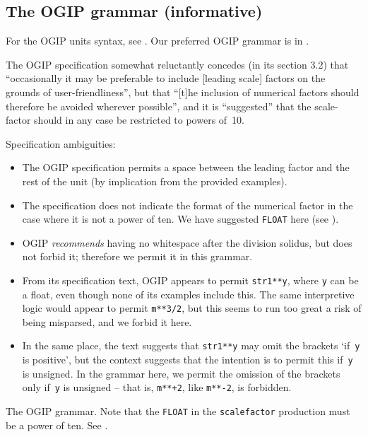 \documentclass[11pt,a4paper]{ivoa}
\begin{document}
\subsection{The OGIP grammar (informative)}
\label{appx:ogipgrammar}

For the OGIP units syntax, see \cite{george95}.  Our preferred OGIP
grammar is in .

The OGIP specification somewhat reluctantly concedes (in its section
3.2) that ``occasionally it may be preferable to include [leading
scale] factors on the grounds of user-friendliness'', but that ``[t]he
inclusion of numerical factors should therefore be avoided wherever
possible'', and it is ``suggested'' that the scale-factor should in any case
be restricted to powers of~10.

Specification ambiguities:
\begin{itemize}
\item The OGIP specification permits a space between the leading
  factor and the rest of the unit (by implication from the provided
  examples).
\item The specification does not indicate the format of the numerical
  factor in the case where it is not a power of ten.  We have
  suggested \texttt{FLOAT} here (see ).
\item OGIP \emph{recommends} having no whitespace after the division
  solidus, but does not forbid it; therefore we permit it in this
  grammar.
\item From its specification text, OGIP appears to permit
  \texttt{str1**y}, where \texttt{y} can be a float, even though none
  of its examples include this.  The same interpretive logic would
  appear to permit \texttt{m**3/2}, but this seems to run too great a
  risk of being misparsed, and we forbid it here.
\item In the same place, the text suggests that \texttt{str1**y} may
  omit the brackets `if~\texttt y is positive', but the context
  suggests that the intention is to permit this if~\texttt y is
  unsigned.  In the grammar here, we permit the omission of the
  brackets only if~\texttt y is unsigned -- that is, \texttt{m**+2},
  like \texttt{m**-2}, is forbidden.
\end{itemize}

\begin{table}[ht]

\caption[The OGIP grammar]{\label{tabx:ogipgrammar}The OGIP grammar.
Note that the \texttt{FLOAT} in the \texttt{scalefactor} production
must be a power of ten.
See .}
\end{table}
\clearpage
\end{document}
